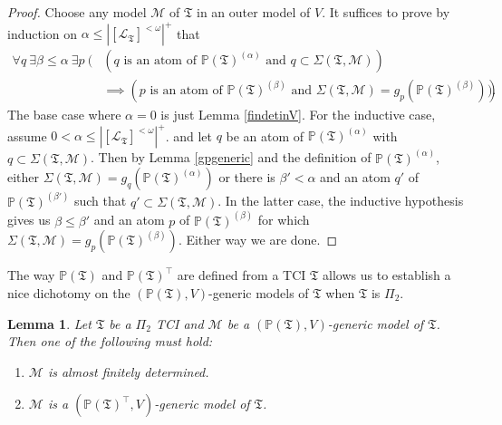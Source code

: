 \documentclass[12pt, twoside]{memoir}
\numberwithin{equation}{section}
\newtheorem{lem}[thm]{Lemma}
\theoremstyle{definition}
\theoremstyle{remark}
\theoremstyle{definition}
\theoremstyle{definition}
\theoremstyle{definition}
\theoremstyle{remark}
\begin{document}
\begin{proof}
Choose any model $\mathcal{M}$ of $\mathfrak{T}$ in an outer model of $V$. It suffices to prove by induction on $\alpha \leq |[\mathcal{L}_{\mathfrak{T}}]^{< \omega}|^+$ that
\begin{align*}
    \forall q \ \exists \beta \leq \alpha \ \exists p \ ( & (q \text{ is an atom of } \mathbb{P}(\mathfrak{T})^{(\alpha)} \text{ and } q \subset \Sigma(\mathfrak{T}, \mathcal{M})) \\
    & \implies (p \text{ is an atom of } \mathbb{P}(\mathfrak{T})^{(\beta)} \text{ and } \Sigma(\mathfrak{T}, \mathcal{M}) = g_p (\mathbb{P}(\mathfrak{T})^{(\beta)}))) \text{.}
\end{align*}
The base case where $\alpha = 0$ is just Lemma \ref{findetinV}. For the inductive case, assume $0 < \alpha \leq |[\mathcal{L}_{\mathfrak{T}}]^{< \omega}|^+$. and let $q$ be an atom of $\mathbb{P}(\mathfrak{T})^{(\alpha)}$ with $q \subset \Sigma(\mathfrak{T}, \mathcal{M})$. Then by Lemma \ref{gpgeneric} and the definition of $\mathbb{P}(\mathfrak{T})^{(\alpha)}$, either $\Sigma(\mathfrak{T}, \mathcal{M}) = g_q (\mathbb{P}(\mathfrak{T})^{(\alpha)})$ or there is $\beta' < \alpha$ and an atom $q'$ of $\mathbb{P}(\mathfrak{T})^{(\beta')}$ such that $q' \subset \Sigma(\mathfrak{T}, \mathcal{M})$. In the latter case, the inductive hypothesis gives us $\beta \leq \beta'$ and an atom $p$ of $\mathbb{P}(\mathfrak{T})^{(\beta)}$ for which $\Sigma(\mathfrak{T}, \mathcal{M}) = g_p (\mathbb{P}(\mathfrak{T})^{(\beta)})$. Either way we are done.
\end{proof}

The way $\mathbb{P}(\mathfrak{T})$ and $\mathbb{P}(\mathfrak{T})^{\top}$ are defined from a TCI $\mathfrak{T}$ allows us to establish a nice dichotomy on the $(\mathbb{P}(\mathfrak{T}), V)$-generic models of $\mathfrak{T}$ when $\mathfrak{T}$ is $\Pi_2$.

\begin{lem}
Let $\mathfrak{T}$ be a $\Pi_2$ TCI and $\mathcal{M}$ be a $(\mathbb{P}(\mathfrak{T}), V)$-generic model of $\mathfrak{T}$. Then one of the following must hold:
\begin{enumerate}[label=(\arabic*)]
    \item $\mathcal{M}$ is almost finitely determined.
    \item $\mathcal{M}$ is a $(\mathbb{P}(\mathfrak{T})^{\top}, V)$-generic model of $\mathfrak{T}$.
\end{enumerate}
\end{lem}
\end{document}
